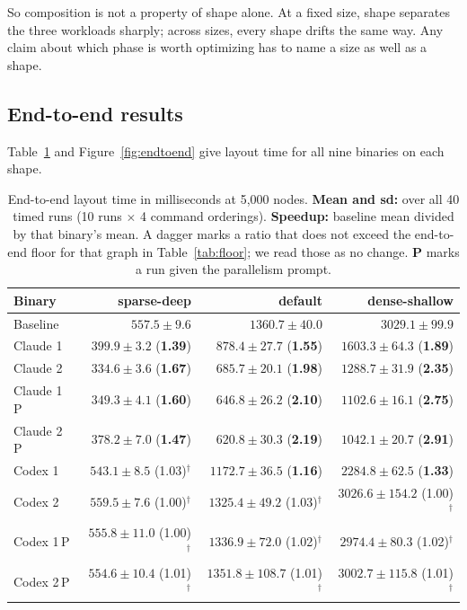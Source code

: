 So composition is not a property of shape alone. At a fixed size, shape
separates the three workloads sharply; across sizes, every shape drifts the same
way. Any claim about which phase is worth optimizing has to name a size as well
as a shape.

\subsection{End-to-end results}

Table~\ref{tab:endtoend} and Figure~\ref{fig:endtoend} give layout time for all
nine binaries on each shape.

\begin{table}[htbp]
\centering
\caption{End-to-end layout time in milliseconds at 5{,}000 nodes.
\textbf{Mean and sd:} over all 40 timed runs (10 runs $\times$ 4 command
orderings). \textbf{Speedup:} baseline mean divided by that binary's mean. A
dagger marks a ratio that does not exceed the end-to-end floor for that graph in
Table~\ref{tab:floor}; we read those as no change. \textbf{P} marks a run given
the parallelism prompt.}
\label{tab:endtoend}
\small
\begin{tabular}{lrrr}
\toprule
\textbf{Binary} & \textbf{sparse-deep} & \textbf{default} & \textbf{dense-shallow} \\
\midrule
Baseline          & $557.5 \pm 9.6$ & $1360.7 \pm 40.0$ & $3029.1 \pm 99.9$ \\
\midrule
Claude 1          & $399.9 \pm 3.2$ \; (\textbf{1.39}) & $878.4 \pm 27.7$ \; (\textbf{1.55}) & $1603.3 \pm 64.3$ \; (\textbf{1.89}) \\
Claude 2          & $334.6 \pm 3.6$ \; (\textbf{1.67}) & $685.7 \pm 20.1$ \; (\textbf{1.98}) & $1288.7 \pm 31.9$ \; (\textbf{2.35}) \\
Claude 1\,P       & $349.3 \pm 4.1$ \; (\textbf{1.60}) & $646.8 \pm 26.2$ \; (\textbf{2.10}) & $1102.6 \pm 16.1$ \; (\textbf{2.75}) \\
Claude 2\,P       & $378.2 \pm 7.0$ \; (\textbf{1.47}) & $620.8 \pm 30.3$ \; (\textbf{2.19}) & $1042.1 \pm 20.7$ \; (\textbf{2.91}) \\
\midrule
Codex 1           & $543.1 \pm 8.5$ \; (1.03)$^\dagger$ & $1172.7 \pm 36.5$ \; (\textbf{1.16}) & $2284.8 \pm 62.5$ \; (\textbf{1.33}) \\
Codex 2           & $559.5 \pm 7.6$ \; (1.00)$^\dagger$ & $1325.4 \pm 49.2$ \; (1.03)$^\dagger$ & $3026.6 \pm 154.2$ \; (1.00)$^\dagger$ \\
Codex 1\,P        & $555.8 \pm 11.0$ \; (1.00)$^\dagger$ & $1336.9 \pm 72.0$ \; (1.02)$^\dagger$ & $2974.4 \pm 80.3$ \; (1.02)$^\dagger$ \\
Codex 2\,P        & $554.6 \pm 10.4$ \; (1.01)$^\dagger$ & $1351.8 \pm 108.7$ \; (1.01)$^\dagger$ & $3002.7 \pm 115.8$ \; (1.01)$^\dagger$ \\
\bottomrule
\end{tabular}
\end{table}

